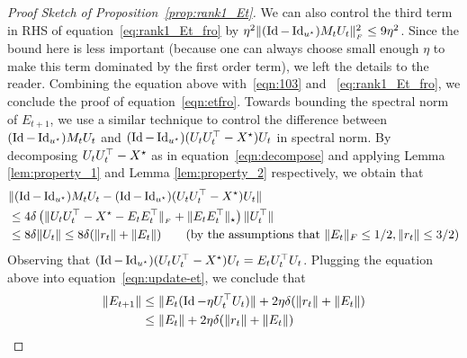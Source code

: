 \begin{proof}[Proof Sketch of Proposition~\ref{prop:rank1_Et}]
We can also control the third term in RHS of equation~\eqref{eq:rank1_Et_fro} by 
$
\eta^2 \|(\operatorname{Id} - \operatorname{Id}_{{u^{\star}}}) M_t U_t\|_{_{F}}^2 \le 9\eta^2
$.
Since the bound here is less important (because one can always choose small enough $\eta$ to make this term dominated by the first order term), we left the details to the reader. Combining the equation above with~\eqref{eqn:103} and ~\eqref{eq:rank1_Et_fro}, we conclude the proof of equation~\eqref{eqn:etfro}. 
%
	Towards bounding the spectral norm of $E_{t+1}$, we use a similar technique to control the difference between $(\operatorname{Id} - \operatorname{Id}_{{u^{\star}}}) M_t U_t$ and $(\operatorname{Id} - \operatorname{Id}_{{u^{\star}}}) (U_t U_t^{\top} - {X}^\star) U_t$ in spectral norm. By decomposing $U_t U_t^{\top} - {X}^\star$ as in equation~\eqref{eqn:decompose} and applying Lemma \ref{lem:property_1} 
	and Lemma \ref{lem:property_2} respectively, we obtain that 
	\begin{align*}
		&\norm{\Pustar M_t U_t - \Pustar (U_t U_t^{\top} - \bXg) U_t} \nonumber\\
		& \le 
		4\delta\left(\normFro{U_t U_t^{\top} - \bXg - E_t E_t^{\top}} + \norm{E_tE_t^\top}_\star \right) \norm{U_t^{\top}}\nonumber\\
		& \le 8 \delta \norm{U_t} \le 8\delta (\norm{r_t} + \norm{E_t}) \tag{by the assumptions that $\norm{E_t}_F\le 1/2, \norm{r_t}\le 3/2$}
	\end{align*}
	Observing that $(\operatorname{Id} - \operatorname{Id}_{{u^{\star}}}) (U_t U_t^{\top} - {X}^\star) U_t = E_tU_t^\top U_t$. Plugging the equation above into equation~\eqref{eqn:update-et}, we conclude that
	\begin{align*}
		\|E_{t+1}\| &\le \|E_t (\operatorname{Id} - \eta U_t^{\top}U_t)\| + 2\eta\delta (\|r_t\| + \|E_t\|) \\
		&\le \|E_t\| + 2\eta\delta (\|r_t\| + \|E_t\|)
	\end{align*}
\end{proof}


